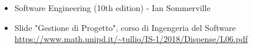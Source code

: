 \begin{itemize}
    \item Software Engineering (10th edition) - Ian Sommerville
    \item Slide "Gestione di Progetto", corso di Ingengeria del Software
          \newline \url{https://www.math.unipd.it/~tullio/IS-1/2018/Dispense/L06.pdf}
\end{itemize}
